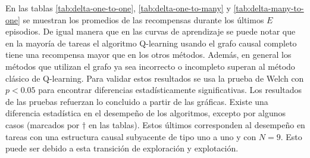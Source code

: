 En las tablas \ref{tab:delta-one-to-one}, \ref{tab:delta-one-to-many} y \ref{tab:delta-many-to-one} se muestran
los promedios de las recompensas durante los últimos $E$ episodios. 
De igual manera que en las curvas de aprendizaje se puede notar que en la mayoría de tareas el algoritmo Q-learning usando el grafo causal completo tiene una recompensa mayor que en los otros métodos. Además, en general los métodos que utilizan el grafo ya sea incorrecto o incompleto superan al método clásico de Q-learning. Para validar estos resultados se usa la prueba de Welch con $p < 0.05$ para encontrar diferencias estadísticamente significativas. 
Los resultados de las pruebas refuerzan lo concluido a partir de las gráficas. Existe una diferencia estadística en el desempeño de los algoritmos, excepto por algunos casos (marcados por $\dagger$ en las tablas). Estos últimos corresponden
al desempeño en tareas con una estructura causal subyacente de tipo uno a uno y con $N=9$. Esto puede ser debido a esta transición
de exploración y explotación. 

